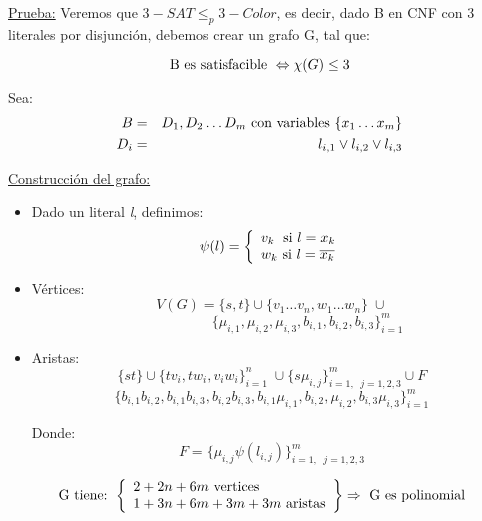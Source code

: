 \documentclass[12pt,a4paper]{report}
\begin{document}
		\underline{Prueba:} Veremos que $3-SAT \leq_{p} 3-Color$, es decir, dado B en CNF con 3 literales por disjunción, debemos crear un grafo G, tal que:

			\[ \textup{B es satisfacible } \Leftrightarrow \chi(G) \leq 3 \]

		\par Sea:
			\begin{eqnarray}
				\nonumber B &=& D_{1}, D_{2} \dotsc D_{m} \textup{ con variables } \lbrace x_{1} \dotsc x_{m} \rbrace \\
				\nonumber D_{i} &=& l_{i, 1} \vee l_{i, 2} \vee l_{i, 3}
			\end{eqnarray}

		\vspace{3mm}
		\underline{Construcción del grafo:}
			\begin{itemize}
				\item Dado un literal \textit{l}, definimos:
					\begin{equation*}
						\psi(l) =
  						\left \lbrace
		  				\begin{array}{l}
    				 	v_{k} \; \textup{ si } l = x_{k} \\
    		 			w_{k} \textup{ si } l = \overline{x_{k}}
		  				\end{array}
  						\right.
					\end{equation*}
				\item Vértices:
					\[ V(G) = \lbrace s, t \rbrace \cup \lbrace v_{1} \dotsc v_{n}, w_{1} \dotsc w_{n} \rbrace \; \cup \]
					\[ \qquad \qquad \; \; \; \; \lbrace \mu_{i, 1}, \mu_{i, 2}, \mu_{i, 3}, b_{i, 1}, b_{i, 2}, b_{i, 3} \rbrace_{i = 1}^{m}  \]
					\item Aristas:
						\[ \lbrace s t \rbrace \cup \lbrace t v_{i}, t w_{i}, v_{i} w_{i} \rbrace_{i = 1}^{n} \; \cup \lbrace s \mu_{i, j} \rbrace_{i = 1, \; \; j = 1, 2, 3}^{m} \cup F \]
						\[ \lbrace b_{i, 1} b_{i, 2}, b_{i, 1} b_{i, 3}, b_{i, 2} b_{i, 3}, b_{i, 1} \mu_{i, 1}, b_{i, 2}, \mu_{i, 2}, b_{i, 3} \mu_{i, 3} \rbrace_{i = 1}^{m}\]
						\par Donde:
							\[ F = \lbrace \mu_{i, j} \psi(l_{i, j}) \rbrace_{i = 1, \; \; j = 1, 2, 3}^{m}\]
			\end{itemize}

			\begin{equation*}
						\textup{ G tiene: }
  						\left \lbrace
		  				\begin{array}{l}
    				 		2 + 2n + 6m \textup{ vertices} \\
    				 		1 + 3n + 6m+ 3m + 3m \textup{ aristas}
		  				\end{array}
  						\right\rbrace
  						\Rightarrow \textup{ G es polinomial}
					\end{equation*}
\end{document}
